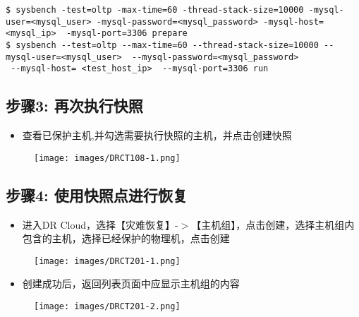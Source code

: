 \begin{verbatim}
$ sysbench -test=oltp -max-time=60 -thread-stack-size=10000 -mysql-user=<mysql_user> -mysql-password=<mysql_password> -mysql-host=<mysql_ip>  -mysql-port=3306 prepare
$ sysbench --test=oltp --max-time=60 --thread-stack-size=10000 --mysql-user=<mysql_user>  --mysql-password=<mysql_password>
 --mysql-host= <test_host_ip>  --mysql-port=3306 run
\end{verbatim}

\subsection{步骤3: 再次执行快照}
\label{步骤3:再次执行快照}

\begin{itemize}
\item 查看已保护主机,并勾选需要执行快照的主机，并点击创建快照

\end{itemize}

\begin{figure}[htbp]
\centering
\texttt{[image: images/DRCT108-1.png]}
\end{figure}

\subsection{步骤4: 使用快照点进行恢复}
\label{步骤4:使用快照点进行恢复}

\begin{itemize}
\item 进入DR Cloud，选择【灾难恢复】-$>$【主机组】，点击创建，选择主机组内包含的主机，选择已经保护的物理机，点击创建

\end{itemize}

\begin{figure}[htbp]
\centering
\texttt{[image: images/DRCT201-1.png]}
\end{figure}

\begin{itemize}
\item 创建成功后，返回列表页面中应显示主机组的内容

\end{itemize}

\begin{figure}[htbp]
\centering
\texttt{[image: images/DRCT201-2.png]}
\end{figure}

